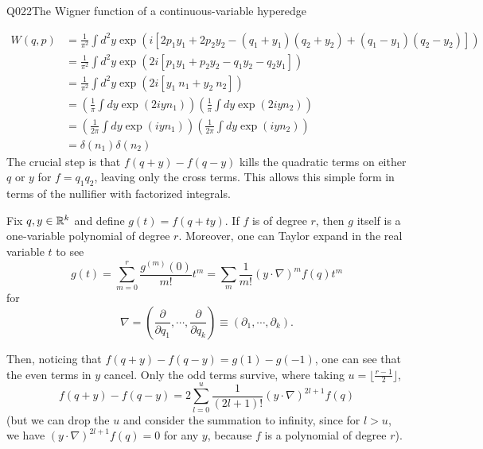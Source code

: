 \begin{entry}{Q022}{The Wigner function of a continuous-variable hyperedge}
\begin{solution}[Part (a)]
\begin{equation}
\begin{split}
    W(q,p)&= \frac{1}{\pi^2} \int d^2y \exp\left(i[2p_1y_1 +2p_2y_2- (q_1+y_1)(q_2+y_2)+(q_1-y_1)(q_2-y_2)]\right)\\
    &= \frac{1}{\pi^2} \int d^2y \exp\left(2i[p_1y_1 +p_2y_2- q_1y_2- q_2y_1]\right)\\
    &= \frac{1}{\pi^2} \int d^2y \exp\left(2i[y_1\ n_1 +y_2\ n_2]\right)\\
    &= \left(\frac{1}{\pi} \int dy \exp(2iyn_1)\right) \left(\frac{1}{\pi} \int dy \exp(2iyn_2)\right)\\
    &= \left(\frac{1}{2\pi} \int dy \exp(iyn_1)\right) \left(\frac{1}{2\pi} \int dy \exp(iyn_2)\right)\\
    &= \delta(n_1)\delta(n_2)
\end{split}
\label{q022:graph-wigner}
\end{equation}
The crucial step is that $f(q+y)-f(q-y)$ kills the quadratic terms on either $q$ or $y$ for $f=q_1q_2$, leaving only the cross terms. This allows this simple form in terms of the nullifier with factorized integrals.
\end{solution}

\begin{solution}[Part (b)]
Fix $q,y \in \mathbb{R}^k$ and define $g(t)=f(q+ty)$. If $f$ is of degree $r$, then $g$ itself is a one-variable polynomial of degree $r$. Moreover, one can Taylor expand in the real variable $t$ to see
\begin{equation}
    g(t)= \sum_{m=0}^r \frac{g^{(m)}(0)}{m!} t^m= \sum_{m} \frac{1}{m!} \left(y\cdot\nabla \right)^mf(q)  t^m
\end{equation}
for
\[
  \nabla = \left(\frac{\partial}{\partial q_1},\cdots,\frac{\partial}{\partial q_k}\right)\equiv\left(\partial_1,\cdots,\partial_k\right).
\]

Then, noticing that $f(q+y)-f(q-y)=g(1)-g(-1)$, one can see that the even terms in $y$ cancel. Only the odd terms survive, where taking $u=\lfloor  \frac{r-1}{2}\rfloor$,
\begin{equation}
    f(q+y)-f(q-y) = 2\sum_{l=0}^{u} \frac{1}{(2l+1)!} \left(y\cdot\nabla \right)^{2l+1}f(q)
    \label{q022:odd-expansion}
\end{equation}
(but we can drop the $u$ and consider the summation to infinity, since for $l>u$, we have $\left(y\cdot\nabla \right)^{2l+1}f(q)=0$ for any $y$, because $f$ is a polynomial of degree $r$).


\end{solution}
\end{entry}
